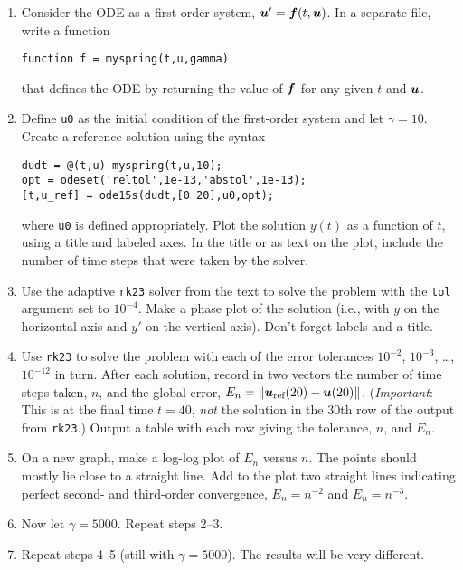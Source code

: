 \documentclass[11pt,twoside]{article}
\begin{document}
\begin{enumerate}
\item Consider the ODE as a first-order system, $\bm{u}'=\bm{f}(t,\bm{u})$. In a separate file, write a function 
\begin{verbatim}
function f = myspring(t,u,gamma)
\end{verbatim} that defines the ODE by returning the value of $\bm{f}$ for any given $t$ and $\bm{u}$. 

\item Define \texttt{u0} as the initial condition of the first-order system and let $\gamma=10$. Create a reference solution using the syntax
\begin{verbatim}
dudt = @(t,u) myspring(t,u,10);
opt = odeset('reltol',1e-13,'abstol',1e-13);
[t,u_ref] = ode15s(dudt,[0 20],u0,opt);
\end{verbatim}
  where \texttt{u0} is defined appropriately. Plot the solution $y(t)$ as a function of $t$, using a title and labeled axes. In the title or as text on the plot, include the number of time steps that were taken by the solver.

\item Use the adaptive \texttt{rk23} solver from the text to solve the
  problem with the \texttt{tol} argument set to $10^{-4}$. Make a
  phase plot of the solution (i.e., with $y$ on the horizontal axis
  and $y'$ on the vertical axis). Don't forget labels and a title.

\item Use \texttt{rk23} to solve the problem with each of the error
  tolerances $10^{-2}$, $10^{-3}$, \ldots, $10^{-12}$ in turn. After each
  solution, record in two vectors the number of time steps
  taken, $n$, and the global error, $E_n=\| \bm{u}_{\text{ref}}(20) - \bm{u}(20)\|$. (\emph{Important}: This is at the final time $t=40$, \emph{not} the solution in the 30th row of the output from \texttt{rk23}.) Output a table with each row giving the tolerance, $n$, and $E_n$. 

\item On a new graph, make a log-log plot of $E_n$ versus $n$. The points
    should mostly lie close to a straight line. Add to the plot two
    straight lines indicating perfect second- and third-order convergence,
    $E_n=n^{-2}$ and $E_n=n^{-3}$.
    
\item Now let $\gamma=5000$. Repeat steps 2--3.
    
\item Repeat steps 4--5 (still with $\gamma=5000$). The results will be very different.
\end{enumerate}
\end{document}
